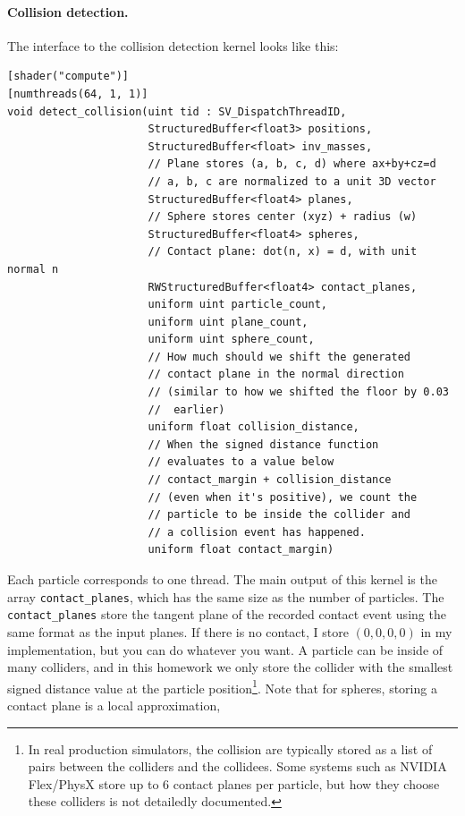 \paragraph{Collision detection.} The interface to the collision detection kernel looks like this:
\begin{lstlisting}[language=Slang]
[shader("compute")]
[numthreads(64, 1, 1)]
void detect_collision(uint tid : SV_DispatchThreadID,
                      StructuredBuffer<float3> positions,
                      StructuredBuffer<float> inv_masses,
                      // Plane stores (a, b, c, d) where ax+by+cz=d
                      // a, b, c are normalized to a unit 3D vector
                      StructuredBuffer<float4> planes,
                      // Sphere stores center (xyz) + radius (w)
                      StructuredBuffer<float4> spheres,
                      // Contact plane: dot(n, x) = d, with unit normal n
                      RWStructuredBuffer<float4> contact_planes,
                      uniform uint particle_count,
                      uniform uint plane_count,
                      uniform uint sphere_count,
                      // How much should we shift the generated 
                      // contact plane in the normal direction
                      // (similar to how we shifted the floor by 0.03
                      //  earlier)
                      uniform float collision_distance,
                      // When the signed distance function
                      // evaluates to a value below 
                      // contact_margin + collision_distance
                      // (even when it's positive), we count the
                      // particle to be inside the collider and
                      // a collision event has happened.
                      uniform float contact_margin)
\end{lstlisting}
Each particle corresponds to one thread. The main output of this kernel is the array \lstinline{contact_planes}, which has the same size as the number of particles. The \lstinline{contact_planes} store the tangent plane of the recorded contact event using the same format as the input planes. If there is no contact, I store $(0, 0, 0, 0)$ in my implementation, but you can do whatever you want. A particle can be inside of many colliders, and in this homework we only store the collider with the smallest signed distance value at the particle position\footnote{In real production simulators, the collision are typically stored as a list of pairs between the colliders and the collidees. Some systems such as NVIDIA Flex/PhysX store up to 6 contact planes per particle, but how they choose these colliders is not detailedly documented.}. Note that for spheres, storing a contact plane is a local approximation, 

